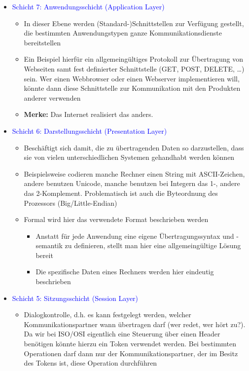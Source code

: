 \begin{itemize}
    \item \textcolor{blue}{Schicht 7: Anwendungsschicht (Application Layer)}
    \begin{itemize}
        \item In dieser Ebene werden (Standard-)Schnittstellen zur Verfügung gestellt, die bestimmten Anwendungstypen ganze Kommunikationsdienste bereitstellen
        \item Ein Beispiel hierfür ein allgemeingültiges Protokoll zur Übertragung von Webseiten samt fest definierter Schnittstelle (GET, POST, DELETE, …) sein. Wer einen Webbrowser oder einen Webserver implementieren will, könnte dann diese Schnittstelle zur Kommunikation mit den Produkten anderer verwenden
        \item \textbf{Merke:} Das Internet realisiert das anders.
    \end{itemize}
    \item \textcolor{blue}{Schicht 6: Darstellungsschicht (Presentation Layer)}
    \begin{itemize}
        \item Beschäftigt sich damit, die zu übertragenden Daten so darzustellen, dass sie von vielen unterschiedlichen Systemen gehandhabt werden können
        \item Beispielsweise codieren manche Rechner einen String mit ASCII-Zeichen, andere benutzen Unicode, manche benutzen bei Integern das 1-, andere das 2-Komplement. Problematisch ist auch die Byteordnung des Prozessors (Big/Little-Endian)
        \item Formal wird hier das verwendete Format beschrieben werden
        \begin{itemize}
            \item Anstatt für jede Anwendung eine eigene Übertragungssyntax und -semantik zu definieren, stellt man hier eine allgemeingültige Lösung bereit
            \item Die spezifische Daten eines Rechners werden hier eindeutig beschrieben
        \end{itemize}
    \end{itemize}
    \item \textcolor{blue}{Schicht 5: Sitzungsschicht (Session Layer)}
    \begin{itemize}
        \item Dialogkontrolle, d.h. es kann festgelegt werden, welcher Kommunikationspartner wann übertragen darf (wer redet, wer hört zu?). Da wir bei ISO/OSI eigentlich eine Steuerung über einen Header benötigen könnte hierzu ein Token verwendet werden. Bei bestimmten Operationen darf dann nur der Kommunikationspartner, der im Besitz des Tokens ist, diese Operation durchführen

\end{itemize}
\end{itemize}
